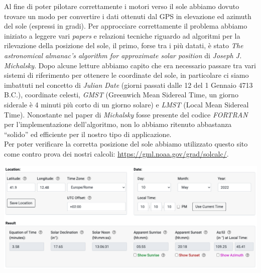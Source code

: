 \noindent Al fine di poter pilotare correttamente i motori verso il sole abbiamo
dovuto trovare un modo per convertire i dati ottenuti dal GPS in
elevazione ed azimuth del sole (espressi in gradi). Per approcciare
correttamente il problema abbiamo iniziato a leggere vari \emph{papers}
e relazioni tecniche riguardo ad algoritmi per la rilevazione della
posizione del sole, il primo, forse tra i più datati, è stato \emph{The
astronomical almanac's algorithm for approximate solar position} di
\emph{Joseph J. Michalsky}. Dopo alcune letture abbiamo capito che era
necessario passare tra vari sistemi di riferimento per ottenere le
coordinate del sole, in particolare ci siamo imbattuti nel concetto di
\emph{Julian Date} (giorni passati dalle 12 del 1 Gennaio 4713 B.C.),
coordinate celesti, \emph{GMST} (Greenwich Mean Sidereal Time, un giorno
siderale è 4 minuti più corto di un giorno solare) e \emph{LMST} (Local
Mean Sidereal Time). Nonostante nel paper di \emph{Michalsky} fosse
presente del codice \emph{FORTRAN} per l'implementazione dell'algoritmo,
non lo abbiamo ritenuto abbastanza ``solido'' ed efficiente per il
nostro tipo di applicazione.\\
Per poter verificare la corretta posizione del sole abbiamo utilizzato
questo sito come contro prova dei nostri calcoli:
\href{https://gml.noaa.gov/grad/solcalc/}{\underline{https://gml.noaa.gov/grad/solcalc/}}.

\begin{center}
\includegraphics[scale=0.35]{figures/image72.png}
\captionsetup{type=figure}
\end{center}

